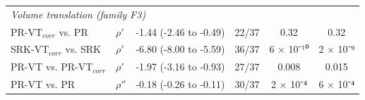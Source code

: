 \begin{table}[H]
\begin{tabular}{llcccc}
\multicolumn{6}{l}{\emph{Volume translation (family F3)}} \\
PR-VT$_{corr}$ vs. PR & $\rho'$ & -1.44 (-2.46 to -0.49) & 22/37 & 0.32 & 0.32 \\
SRK-VT$_{corr}$ vs. SRK & $\rho'$ & -6.80 (-8.00 to -5.59) & 36/37 & 6 × 10⁻¹⁰ & 2 × 10⁻⁹ \\
PR-VT vs. PR-VT$_{corr}$ & $\rho'$ & -1.97 (-3.16 to -0.93) & 27/37 & 0.008 & 0.015 \\
PR-VT vs. PR & $\rho''$ & -0.18 (-0.26 to -0.11) & 30/37 & 2 × 10⁻⁴ & 6 × 10⁻⁴ \\
\bottomrule
\end{tabular}
\end{table}
